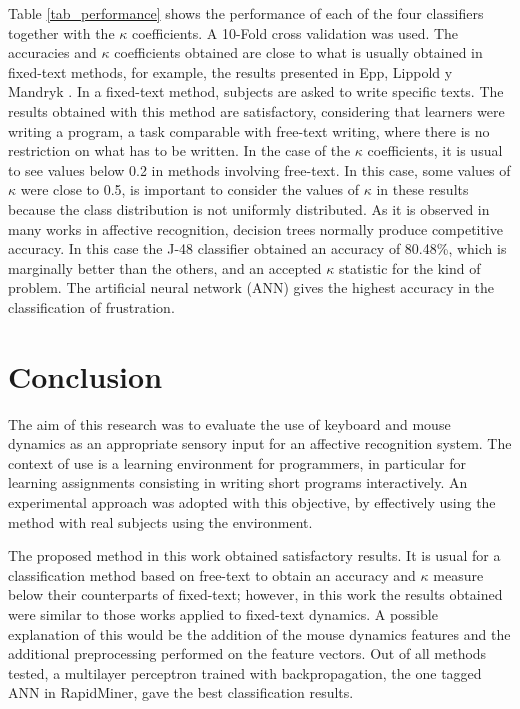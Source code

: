 \documentclass[a4paper,twoside]{article}
\begin{document}
Table \ref{tab_performance} shows the performance of each of the four classifiers together 
with the $\kappa$ coefficients. A 10-Fold cross validation was used. 
The accuracies and $\kappa$ coefficients obtained are close to what is
usually obtained in fixed-text methods, for example, the results presented in
Epp, Lippold y Mandryk \cite{epp2011identifying}. 	
In a fixed-text method, subjects are asked to write specific texts.											 
The results obtained with this method are satisfactory, considering that learners
were writing a program, a task comparable with free-text writing, where there
is no restriction on what has to be written. 
In the case of the $\kappa$ coefficients, it is
usual to see values below 0.2 in methods involving free-text. In this case, some
values of $\kappa$ were close to 0.5, is important to consider the values of $\kappa$
in these results because the class distribution is not uniformly distributed. As
it is observed in many works in affective recognition, decision trees normally
produce competitive accuracy. In this case the J-48 classifier obtained an
accuracy of 80.48\%, which is marginally better than the others, and an accepted $\kappa$
statistic for the kind of problem. The artificial neural network (ANN)
gives the highest
accuracy in the classification of frustration.

 
\section{Conclusion}

The aim of this research was to evaluate the use of keyboard and mouse dynamics 
as an appropriate sensory input for an affective recognition system. The context
of use is a learning environment for programmers, in particular for learning
assignments consisting in writing short programs interactively. An experimental
approach was adopted with this objective, by effectively using the
method with real subjects using the environment.

The proposed method in this work obtained
satisfactory results. It is usual for a classification method based on free-text
to obtain an accuracy and $\kappa$ measure below their counterparts of
fixed-text; however, in this
work the results obtained were similar to those works applied to fixed-text 
dynamics. A possible explanation of this would be the addition of the mouse 
dynamics features and the additional preprocessing performed on the
feature vectors. Out of all methods tested, a multilayer perceptron
trained with backpropagation, the one tagged ANN in RapidMiner,  gave the best classification
results. 
\end{document}
